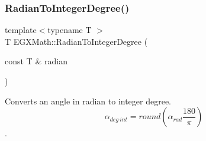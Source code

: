 \mbox{\label{group___e_g_x_math-_angle_conversions-_radian_gac84796dfdeb56235e1e338522a5f9350}} 
\subsubsection{\texorpdfstring{Radian\+To\+Integer\+Degree()}{RadianToIntegerDegree()}}
{\footnotesize\ttfamily template$<$typename T $>$ \\
T E\+G\+X\+Math\+::\+Radian\+To\+Integer\+Degree (\begin{DoxyParamCaption}\item[{const T \&}]{radian }\end{DoxyParamCaption})}



Converts an angle in radian to integer degree. \[\alpha_{deg\ int}=round(\alpha_{rad}\frac{180}{\pi})\]. 

